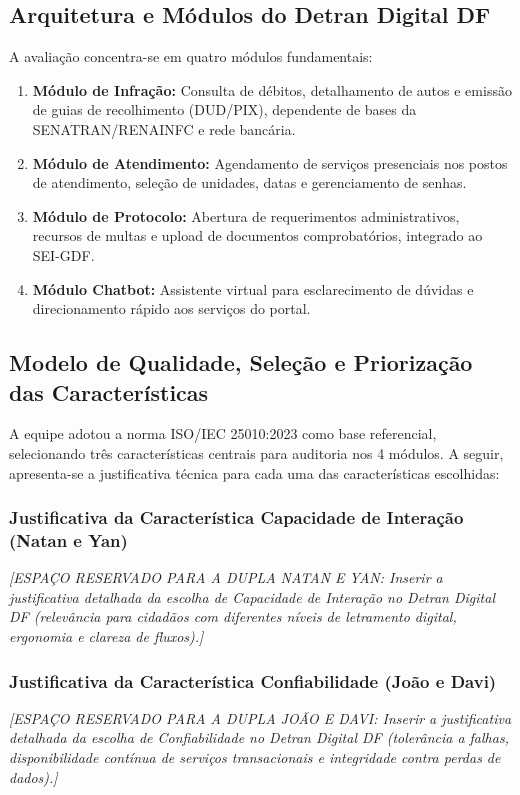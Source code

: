 \documentclass[12pt]{article}
\begin{document}
\subsection{Arquitetura e Módulos do Detran Digital DF}
A avaliação concentra-se em quatro módulos fundamentais:
\begin{enumerate}
    \item \textbf{Módulo de Infração:} Consulta de débitos, detalhamento de autos e emissão de guias de recolhimento (DUD/PIX), dependente de bases da SENATRAN/RENAINFC e rede bancária.
    \item \textbf{Módulo de Atendimento:} Agendamento de serviços presenciais nos postos de atendimento, seleção de unidades, datas e gerenciamento de senhas.
    \item \textbf{Módulo de Protocolo:} Abertura de requerimentos administrativos, recursos de multas e upload de documentos comprobatórios, integrado ao SEI-GDF.
    \item \textbf{Módulo Chatbot:} Assistente virtual para esclarecimento de dúvidas e direcionamento rápido aos serviços do portal.
\end{enumerate}

\subsection{Modelo de Qualidade, Seleção e Priorização das Características}
A equipe adotou a norma ISO/IEC 25010:2023 como base referencial, selecionando três características centrais para auditoria nos 4 módulos. A seguir, apresenta-se a justificativa técnica para cada uma das características escolhidas:

\subsubsection{Justificativa da Característica Capacidade de Interação (Natan e Yan)}
\textit{[ESPAÇO RESERVADO PARA A DUPLA NATAN E YAN: Inserir a justificativa detalhada da escolha de Capacidade de Interação no Detran Digital DF (relevância para cidadãos com diferentes níveis de letramento digital, ergonomia e clareza de fluxos).]}

\subsubsection{Justificativa da Característica Confiabilidade (João e Davi)}
\textit{[ESPAÇO RESERVADO PARA A DUPLA JOÃO E DAVI: Inserir a justificativa detalhada da escolha de Confiabilidade no Detran Digital DF (tolerância a falhas, disponibilidade contínua de serviços transacionais e integridade contra perdas de dados).]}
\end{document}
